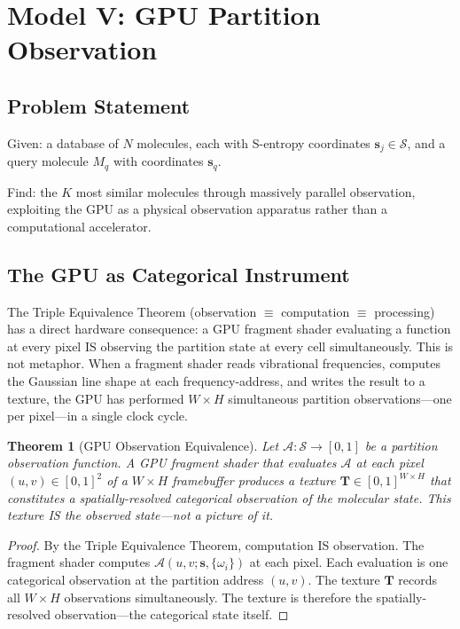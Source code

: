 \documentclass[11pt,twocolumn,a4paper]{article}
\newtheorem{theorem}{Theorem}[section]
\theoremstyle{definition}
\theoremstyle{remark}
\newcommand{\Sspace}{\mathcal{S}}
\begin{document}
\section{Model V: GPU Partition Observation}
\label{sec:model5}

\subsection{Problem Statement}

Given: a database of $N$ molecules, each with S-entropy coordinates $\mathbf{s}_j \in \Sspace$, and a query molecule $M_q$ with coordinates $\mathbf{s}_q$.

Find: the $K$ most similar molecules through massively parallel observation, exploiting the GPU as a physical observation apparatus rather than a computational accelerator.

\subsection{The GPU as Categorical Instrument}

The Triple Equivalence Theorem (observation $\equiv$ computation $\equiv$ processing) has a direct hardware consequence: a GPU fragment shader evaluating a function at every pixel IS observing the partition state at every cell simultaneously. This is not metaphor. When a fragment shader reads vibrational frequencies, computes the Gaussian line shape at each frequency-address, and writes the result to a texture, the GPU has performed $W \times H$ simultaneous partition observations---one per pixel---in a single clock cycle.

\begin{theorem}[GPU Observation Equivalence]
\label{thm:gpu_observation}
Let $\mathcal{A}: \Sspace \to [0,1]$ be a partition observation function. A GPU fragment shader that evaluates $\mathcal{A}$ at each pixel $(u,v) \in [0,1]^2$ of a $W \times H$ framebuffer produces a texture $\mathbf{T} \in [0,1]^{W \times H}$ that constitutes a spatially-resolved categorical observation of the molecular state. This texture IS the observed state---not a picture of it.
\end{theorem}

\begin{proof}
By the Triple Equivalence Theorem, computation IS observation. The fragment shader computes $\mathcal{A}(u, v; \mathbf{s}, \{\omega_i\})$ at each pixel. Each evaluation is one categorical observation at the partition address $(u,v)$. The texture $\mathbf{T}$ records all $W \times H$ observations simultaneously. The texture is therefore the spatially-resolved observation---the categorical state itself.
\end{proof}
\end{document}
